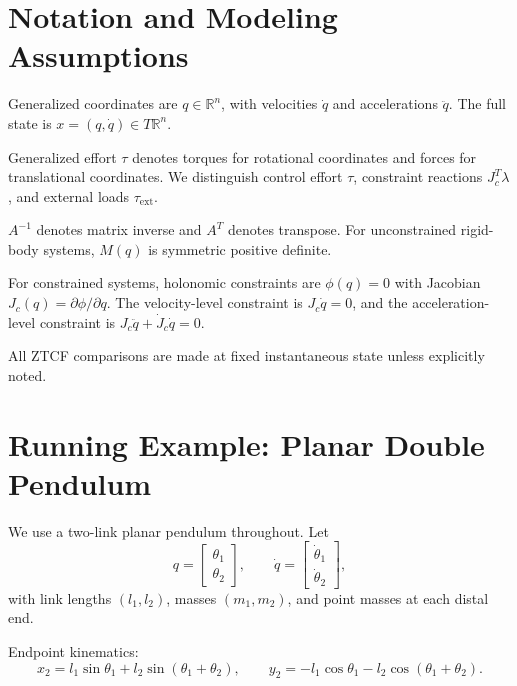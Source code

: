 \documentclass[11pt]{article}
\begin{document}
\section{Notation and Modeling Assumptions}\label{sec:notation}

Generalized coordinates are $q \in \mathbb{R}^n$, with velocities $\dot{q}$ and accelerations $\ddot{q}$.
The full state is $x = (q, \dot{q}) \in T\mathbb{R}^n$.

Generalized effort $\tau$ denotes torques for rotational coordinates and forces for translational coordinates.
We distinguish control effort $\tau$, constraint reactions $J_c^T \lambda$, and external loads $\tau_{\mathrm{ext}}$.

$A^{-1}$ denotes matrix inverse and $A^T$ denotes transpose.
For unconstrained rigid-body systems, $M(q)$ is symmetric positive definite.

For constrained systems, holonomic constraints are $\phi(q) = 0$ with Jacobian $J_c(q) = \partial\phi/\partial q$.
The velocity-level constraint is $J_c \dot{q} = 0$, and the acceleration-level constraint is $J_c \ddot{q} + \dot{J}_c \dot{q} = 0$.

All ZTCF comparisons are made at fixed instantaneous state unless explicitly noted.


\section{Running Example: Planar Double Pendulum}\label{sec:double-pendulum}

We use a two-link planar pendulum throughout.
Let
\begin{equation}\label{eq:dp-coords}
q = \begin{bmatrix}\theta_1 \\ \theta_2\end{bmatrix}, \qquad
\dot{q} = \begin{bmatrix}\dot\theta_1 \\ \dot\theta_2\end{bmatrix},
\end{equation}
with link lengths $(l_1,l_2)$, masses $(m_1,m_2)$, and point masses at each distal end.

Endpoint kinematics:
\begin{equation}\label{eq:dp-kinematics}
x_2 = l_1\sin\theta_1 + l_2\sin(\theta_1+\theta_2), \qquad
y_2 = -l_1\cos\theta_1 - l_2\cos(\theta_1+\theta_2).
\end{equation}
\end{document}
